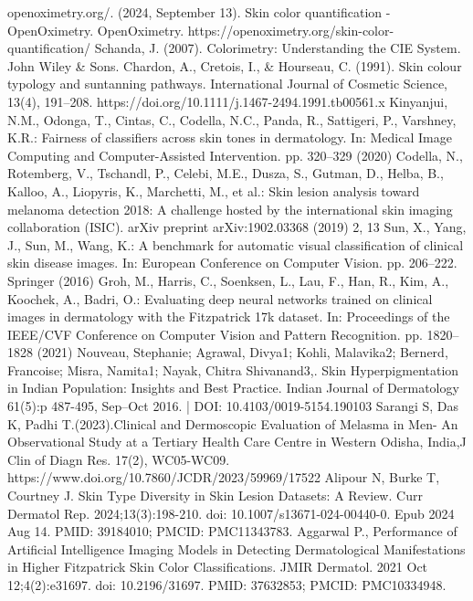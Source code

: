 \begin{thebibliography}{}

openoximetry.org/. (2024, September 13). Skin color quantification - OpenOximetry. OpenOximetry. https://openoximetry.org/skin-color-quantification/
Schanda, J. (2007). Colorimetry: Understanding the CIE System. John Wiley \& Sons.
Chardon, A., Cretois, I., \& Hourseau, C. (1991). Skin colour typology and suntanning pathways. International Journal of Cosmetic Science, 13(4), 191–208. https://doi.org/10.1111/j.1467-2494.1991.tb00561.x
Kinyanjui, N.M., Odonga, T., Cintas, C., Codella, N.C., Panda, R., Sattigeri, P., Varshney, K.R.: Fairness of classifiers across skin tones in dermatology. In: Medical Image Computing and Computer-Assisted Intervention. pp. 320–329 (2020)
Codella, N., Rotemberg, V., Tschandl, P., Celebi, M.E., Dusza, S., Gutman, D., Helba, B., Kalloo, A., Liopyris, K., Marchetti, M., et al.: Skin lesion analysis toward melanoma detection 2018: A challenge hosted by the international skin imaging collaboration (ISIC). arXiv preprint arXiv:1902.03368 (2019) 2, 13
Sun, X., Yang, J., Sun, M., Wang, K.: A benchmark for automatic visual classification of clinical skin disease images. In: European Conference on Computer Vision. pp. 206–222. Springer (2016)
Groh, M., Harris, C., Soenksen, L., Lau, F., Han, R., Kim, A., Koochek, A., Badri, O.: Evaluating deep neural networks trained on clinical images in dermatology with the Fitzpatrick 17k dataset. In: Proceedings of the IEEE/CVF Conference on Computer Vision and Pattern Recognition. pp. 1820–1828 (2021) 
Nouveau, Stephanie; Agrawal, Divya1; Kohli, Malavika2; Bernerd, Francoise; Misra, Namita1; Nayak, Chitra Shivanand3,. Skin Hyperpigmentation in Indian Population: Insights and Best Practice. Indian Journal of Dermatology 61(5):p 487-495, Sep–Oct 2016. | DOI: 10.4103/0019-5154.190103
Sarangi S, Das K, Padhi T.(2023).Clinical and Dermoscopic Evaluation of Melasma in Men- An Observational Study at a Tertiary Health Care Centre in Western Odisha, India,J Clin of Diagn Res. 17(2), WC05-WC09. https://www.doi.org/10.7860/JCDR/2023/59969/17522
Alipour N, Burke T, Courtney J. Skin Type Diversity in Skin Lesion Datasets: A Review. Curr Dermatol Rep. 2024;13(3):198-210. doi: 10.1007/s13671-024-00440-0. Epub 2024 Aug 14. PMID: 39184010; PMCID: PMC11343783.
Aggarwal P., Performance of Artificial Intelligence Imaging Models in Detecting Dermatological Manifestations in Higher Fitzpatrick Skin Color Classifications. JMIR Dermatol. 2021 Oct 12;4(2):e31697. doi: 10.2196/31697. PMID: 37632853; PMCID: PMC10334948.

\end{thebibliography}

